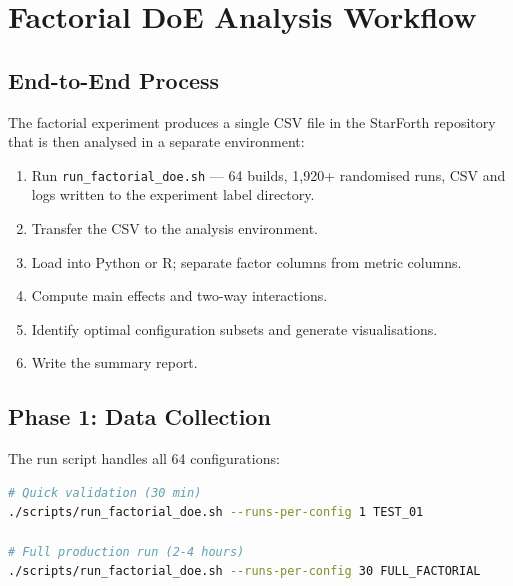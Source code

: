 
\section{Factorial DoE Analysis Workflow}
\label{sec:factorial-doe-workflow}

\subsection{End-to-End Process}

The factorial experiment produces a single CSV file in the StarForth
repository that is then analysed in a separate environment:

\begin{enumerate}
  \item Run \texttt{run\_factorial\_doe.sh} — 64 builds, 1{,}920+ randomised
        runs, CSV and logs written to the experiment label directory.
  \item Transfer the CSV to the analysis environment.
  \item Load into Python or R; separate factor columns from metric columns.
  \item Compute main effects and two-way interactions.
  \item Identify optimal configuration subsets and generate visualisations.
  \item Write the summary report.
\end{enumerate}

\subsection{Phase 1: Data Collection}

The run script handles all 64 configurations:

\begin{lstlisting}[language=bash]
# Quick validation (30 min)
./scripts/run_factorial_doe.sh --runs-per-config 1 TEST_01

# Full production run (2-4 hours)
./scripts/run_factorial_doe.sh --runs-per-config 30 FULL_FACTORIAL
\end{lstlisting}


